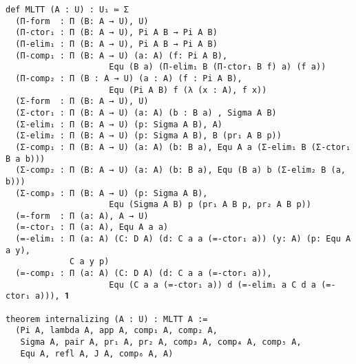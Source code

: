 \begin{lstlisting}
def MLTT (A : U) : U₁ ≔ Σ
  (Π-form  : Π (B: A → U), U)
  (Π-ctor₁ : Π (B: A → U), Pi A B → Pi A B)
  (Π-elim₁ : Π (B: A → U), Pi A B → Pi A B)
  (Π-comp₁ : Π (B: A → U) (a: A) (f: Pi A B),
                     Equ (B a) (Π-elim₁ B (Π-ctor₁ B f) a) (f a))
  (Π-comp₂ : Π (B : A → U) (a : A) (f : Pi A B),
                     Equ (Pi A B) f (λ (x : A), f x))
  (Σ-form  : Π (B: A → U), U)
  (Σ-ctor₁ : Π (B: A → U) (a: A) (b : B a) , Sigma A B)
  (Σ-elim₁ : Π (B: A → U) (p: Sigma A B), A)
  (Σ-elim₂ : Π (B: A → U) (p: Sigma A B), B (pr₁ A B p))
  (Σ-comp₁ : Π (B: A → U) (a: A) (b: B a), Equ A a (Σ-elim₁ B (Σ-ctor₁ B a b)))
  (Σ-comp₂ : Π (B: A → U) (a: A) (b: B a), Equ (B a) b (Σ-elim₂ B (a, b)))
  (Σ-comp₃ : Π (B: A → U) (p: Sigma A B),
                     Equ (Sigma A B) p (pr₁ A B p, pr₂ A B p))
  (=-form  : Π (a: A), A → U)
  (=-ctor₁ : Π (a: A), Equ A a a)
  (=-elim₁ : Π (a: A) (C: D A) (d: C a a (=-ctor₁ a)) (y: A) (p: Equ A a y),
             C a y p)
  (=-comp₁ : Π (a: A) (C: D A) (d: C a a (=-ctor₁ a)),
                     Equ (C a a (=-ctor₁ a)) d (=-elim₁ a C d a (=-ctor₁ a))), 𝟏

theorem internalizing (A : U) : MLTT A :=
  (Pi A, lambda A, app A, comp₁ A, comp₂ A,
   Sigma A, pair A, pr₁ A, pr₂ A, comp₃ A, comp₄ A, comp₅ A,
   Equ A, refl A, J A, comp₆ A, A)
\end{lstlisting}
